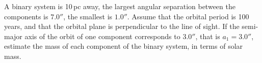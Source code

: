 A binary system is 10\,pc away, the largest angular separation between the
components is $7.0''$, the smallest is $1.0''$. Assume that the orbital
period is 100 years, and that the orbital plane is perpendicular to the line
of sight. If the semi-major axis of the orbit of one component corresponds to
$3.0''$, that is $a_1 = 3.0''$, estimate the mass of each component of the
binary system, in terms of solar mass.
